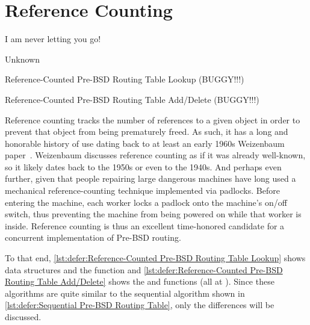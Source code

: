 
\section{Reference Counting}
\label{sec:defer:Reference Counting}
%
\epigraph{I am never letting you go!}{Unknown}

\begin{listing}

\caption{Reference-Counted Pre-BSD Routing Table Lookup (BUGGY!!!)}
\label{lst:defer:Reference-Counted Pre-BSD Routing Table Lookup}
\end{listing}

\begin{listing}

\caption{Reference-Counted Pre-BSD Routing Table Add\slash Delete (BUGGY!!!)}
\label{lst:defer:Reference-Counted Pre-BSD Routing Table Add/Delete}
\end{listing}

Reference counting tracks the number of references to a given object in
order to prevent that object from being prematurely freed.
As such, it has a long and honorable history of use dating back to
at least an early 1960s Weizenbaum
paper~\cite{Weizenbaum:1963:SLP:367593.367617}.
Weizenbaum discusses reference counting as if it was already well-known,
so it likely dates back to the 1950s or even to the 1940s.
And perhaps even further, given that people repairing large dangerous
machines have long used a mechanical reference-counting technique
implemented via padlocks.
Before entering the machine, each worker locks a padlock onto the
machine's on/off switch, thus preventing the machine from being powered
on while that worker is inside.
Reference counting is thus an excellent time-honored candidate for a
concurrent implementation of Pre-BSD routing.

To that end,
\cref{lst:defer:Reference-Counted Pre-BSD Routing Table Lookup}
shows data structures and the  function and
\cref{lst:defer:Reference-Counted Pre-BSD Routing Table Add/Delete}
shows the  and  functions
(all at ).
Since these algorithms are quite similar to the sequential algorithm
shown in
\cref{lst:defer:Sequential Pre-BSD Routing Table},
only the differences will be discussed.

